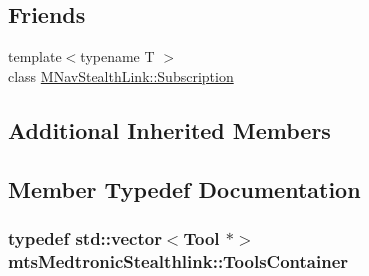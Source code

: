 \subsection*{Friends}
\begin{DoxyCompactItemize}
\item 
{\footnotesize template$<$typename T $>$ }\\class \hyperlink{classmts_medtronic_stealthlink_a4366be00dfae3e97b5db855f73f8e36b}{M\-Nav\-Stealth\-Link\-::\-Subscription}
\end{DoxyCompactItemize}
\subsection*{Additional Inherited Members}


\subsection{Member Typedef Documentation}
\hypertarget{classmts_medtronic_stealthlink_ab6218cf1cbe807b4cc2cc262528e7ae9}{
\subsubsection[{Tools\-Container}]{\setlength{\rightskip}{0pt plus 5cm}typedef std\-::vector$<${\bf Tool} $\ast$$>$ {\bf mts\-Medtronic\-Stealthlink\-::\-Tools\-Container}\hspace{0.3cm}{\ttfamily [protected]}}}\label{classmts_medtronic_stealthlink_ab6218cf1cbe807b4cc2cc262528e7ae9}


